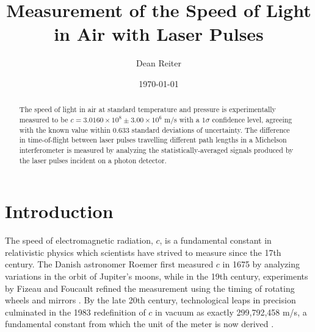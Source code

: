 \documentclass[%
 reprint,
 amsmath,amssymb,
 aps,
]{revtex4-2}
\begin{document}

\title{Measurement of the Speed of Light in Air with Laser Pulses}%

\author{Dean Reiter}
%

\date{\today}%

\begin{abstract}
The speed of light in air at standard temperature and pressure is experimentally measured to be $c = 3.0160 \times 10^8 \pm 3.00 \times 10^6$ m/s with a $1\sigma$ confidence level, agreeing with the known value within 0.633 standard deviations of uncertainty. The difference in time-of-flight between laser pulses travelling different path lengths in a Michelson interferometer is measured by analyzing the statistically-averaged signals produced by the laser pulses incident on a photon detector.

\end{abstract}

\maketitle


\section{Introduction}

The speed of electromagnetic radiation, $c$, is a fundamental constant in relativistic physics which scientists have strived to measure since the 17th century. The Danish astronomer Roemer first measured $c$ in 1675 by analyzing variations in the orbit of Jupiter's moons, while in the 19th century, experiments by Fizeau and Foucault refined the measurement using the timing of rotating wheels and mirrors \cite{french}. By the late 20th century, technological leaps in precision culminated in the 1983 redefinition of $c$ in vacuum as exactly 299,792,458 m/s, a fundamental constant from which the unit of the meter is now derived \cite{NIST_meter}.
\end{document}

